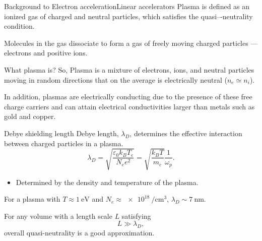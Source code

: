 \documentclass[]{beamer}
\begin{document}
\newcommand{\whatisplasma}{What plasma is?}
\begin{frame}{Background to Electron acceleration}{Linear accelerators}
Plasma is defined as an ionized gas of charged and neutral particles, which  satisfies  the quasi–-neutrality condition.
\begin{figure}
    \centering
\end{figure}
Molecules in the gas dissociate to form a gas of freely moving charged particles --- electrons and positive ions.
\end{frame}
\begin{frame}{\whatisplasma}
So, Plasma is a mixture of electrons, ions, and neutral particles moving in random directions that on the average is electrically neutral ($n_e \simeq n_i$).

In addition, plasmas are electrically conducting due to the presence of these free charge carriers and can attain electrical conductivities larger than metals such as gold and copper.
\end{frame}
\newcommand{\debye}{Debye shielding length}
\begin{frame}{\debye}
  Debye length, $\lambda_D$, determines the effective interaction between charged particles in a plasma.
  \begin{equation*}
\lambda_D=\sqrt{\frac{\varepsilon_0 k_B T_e}{N_e e^2}}=\sqrt{\frac{k_B T}{m_e}}\frac{1}{\omega_p}.
\end{equation*}
\begin{itemize}
  \item Determined by the density and temperature of the plasma.
\end{itemize}
For a plasma with $T\approx \SI{1}{\eV}$ and $N_e\approx \SI{e18}{\per\cubic\cm}$, $\lambda_D\sim \SI{7}{\nm}$.

For any volume with a length scale $L$ satisfying 
\begin{equation*}
L \gg \lambda_D,
\label{eq:quasiNeutrality}
\end{equation*}
overall quasi-neutrality is a good approximation.
\end{frame}
\end{document}
